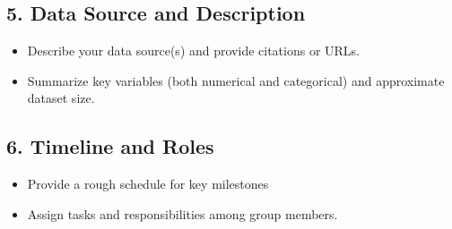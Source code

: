\documentclass[12pt]{article}
\begin{document}
\subsection*{5. Data Source and Description}
\begin{itemize}
    \item Describe your data source(s) and provide citations or URLs.
    \item Summarize key variables (both numerical and categorical) and approximate dataset size.
\end{itemize}

\subsection*{6. Timeline and Roles}
\begin{itemize}
    \item Provide a rough schedule for key milestones
    \item Assign tasks and responsibilities among group members. 
\end{itemize}
\end{document}
